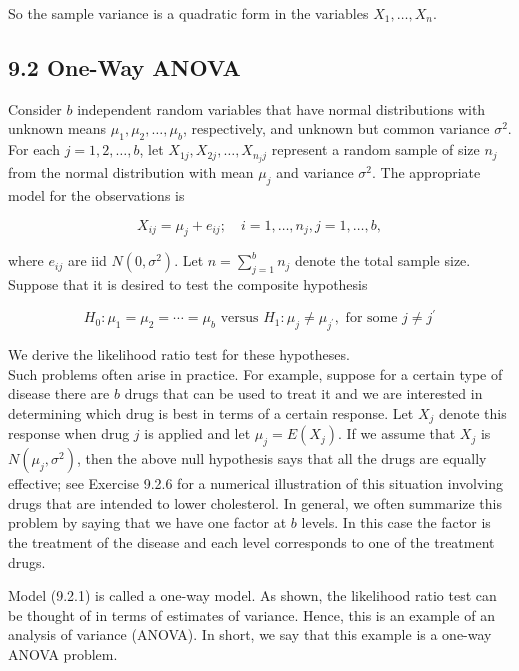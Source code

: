 So the sample variance is a quadratic form in the variables $X_{1}, \ldots, X_{n}$.

\subsection*{9.2 One-Way ANOVA}
Consider $b$ independent random variables that have normal distributions with unknown means $\mu_{1}, \mu_{2}, \ldots, \mu_{b}$, respectively, and unknown but common variance $\sigma^{2}$. For each $j=1,2, \ldots, b$, let $X_{1 j}, X_{2 j}, \ldots, X_{n_{j} j}$ represent a random sample of size $n_{j}$ from the normal distribution with mean $\mu_{j}$ and variance $\sigma^{2}$. The appropriate model for the observations is


\begin{equation*}
X_{i j}=\mu_{j}+e_{i j} ; \quad i=1, \ldots, n_{j}, j=1, \ldots, b, \tag{9.2.1}
\end{equation*}


where $e_{i j}$ are iid $N\left(0, \sigma^{2}\right)$. Let $n=\sum_{j=1}^{b} n_{j}$ denote the total sample size. Suppose that it is desired to test the composite hypothesis


\begin{equation*}
H_{0}: \mu_{1}=\mu_{2}=\cdots=\mu_{b} \text { versus } H_{1}: \mu_{j} \neq \mu_{j^{\prime}}, \text { for some } j \neq j^{\prime} \tag{9.2.2}
\end{equation*}


We derive the likelihood ratio test for these hypotheses.\\
Such problems often arise in practice. For example, suppose for a certain type of disease there are $b$ drugs that can be used to treat it and we are interested in determining which drug is best in terms of a certain response. Let $X_{j}$ denote this response when drug $j$ is applied and let $\mu_{j}=E\left(X_{j}\right)$. If we assume that $X_{j}$ is $N\left(\mu_{j}, \sigma^{2}\right)$, then the above null hypothesis says that all the drugs are equally effective; see Exercise 9.2.6 for a numerical illustration of this situation involving drugs that are intended to lower cholesterol. In general, we often summarize this problem by saying that we have one factor at $b$ levels. In this case the factor is the treatment of the disease and each level corresponds to one of the treatment drugs.

Model (9.2.1) is called a one-way model. As shown, the likelihood ratio test can be thought of in terms of estimates of variance. Hence, this is an example of an\\
analysis of variance (ANOVA). In short, we say that this example is a one-way ANOVA problem.


